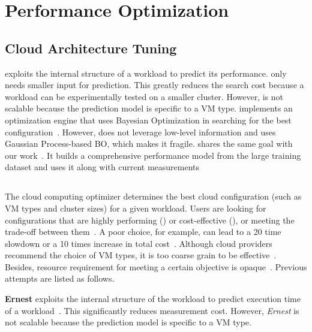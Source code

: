 \section{Performance Optimization}

\subsection{Cloud Architecture Tuning}

\ernest exploits the internal structure of a workload
to predict its performance.
\ernest only needs smaller input for prediction.
This greatly reduces the search cost because
a workload can be experimentally tested on a smaller cluster.
However, \ernest is not scalable because
the prediction model is specific to a VM type.
\cherrypick implements an optimization engine that uses
Bayesian Optimization in searching for
the best configuration~\cite{Alipourfard2017}.
However, \cherrypick does not leverage
low-level information and uses Gaussian Process-based BO, which makes it fragile.
\paris shares the same goal with our work~\cite{Yadwadkar2017}.
It builds a comprehensive performance model from the large training dataset and uses it along with current measurements





\subsection{\micky}
The cloud computing optimizer determines the best cloud configuration (such as VM types and cluster sizes) for a given workload.
Users are looking for configurations that are
highly performing () or
cost-effective (),
or meeting the trade-off between them~\cite{Alipourfard2017,Yadwadkar2017,Hsu2018Arrow}.
A poor choice, for example, can lead to
a 20 time slowdown or a 10 times increase in total cost~\cite{Hsu2018Arrow}.
Although cloud providers recommend the choice of VM types,
it is too coarse grain to be effective~\cite{aws, google_rightsizing}.
Besides, resource requirement for meeting a certain objective
is opaque~\cite{Yadwadkar2017}.
Previous attempts are listed as follows.

\textbf{Ernest}
exploits the internal structure of the workload to predict execution time of a workload~\cite{Venkataraman2016}. This significantly reduces measurement cost. However, \emph{Ernest} is not scalable because the prediction model is specific to a VM type.

